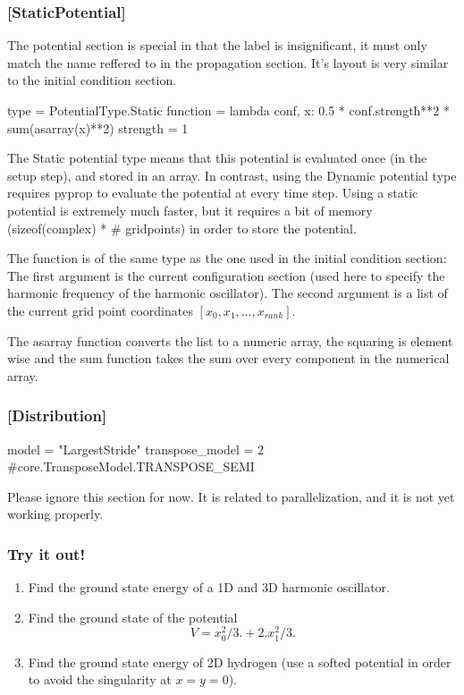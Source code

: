 \subsubsection*{[StaticPotential]}
The potential section is special in that the label is insignificant, it must only match the name reffered to in
the propagation section. It's layout is very similar to the initial condition section.
\begin{python}
	[StaticPotential]
	type = PotentialType.Static
	function = lambda conf, x: 0.5 * conf.strength**2 * sum(asarray(x)**2) 
	strength = 1
\end{python}
The Static potential type means that this potential is evaluated once (in the setup step), and stored in an array.
In contrast, using the Dynamic potential type requires pyprop to evaluate the potential at every time step. 
Using a static potential is extremely much faster, but it requires a bit of memory (sizeof(complex) * \# gridpoints)
in order to store the potential.

The function is of the same type as the one used in the initial condition section: The first argument is the current
configuration section (used here to specify the harmonic frequency of the harmonic oscillator). The second argument is
a list of the current grid point coordinates $[x_0, x_1, ..., x_{rank}]$. 

The asarray function converts the list to a
numeric array, the squaring is element wise and the sum function takes the sum over every component in the numerical 
array.

\subsubsection*{[Distribution]}
\begin{python}
	[Distribution]
	model = "LargestStride"
	transpose_model = 2 #core.TransposeModel.TRANSPOSE_SEMI
\end{python}
Please ignore this section for now. It is related to parallelization, and it is not yet working
properly.

\subsubsection*{Try it out!}
\begin{enumerate}
\item Find the ground state energy of a 1D and 3D harmonic oscillator.

\item Find the ground state of the potential 
\begin{equation}
	V = x_0^2/3. + 2. x_1^2/3.
\end{equation}

\item Find the ground state energy of 2D hydrogen 
(use a softed potential in order to avoid the singularity at $x = y = 0$).
\end{enumerate}

